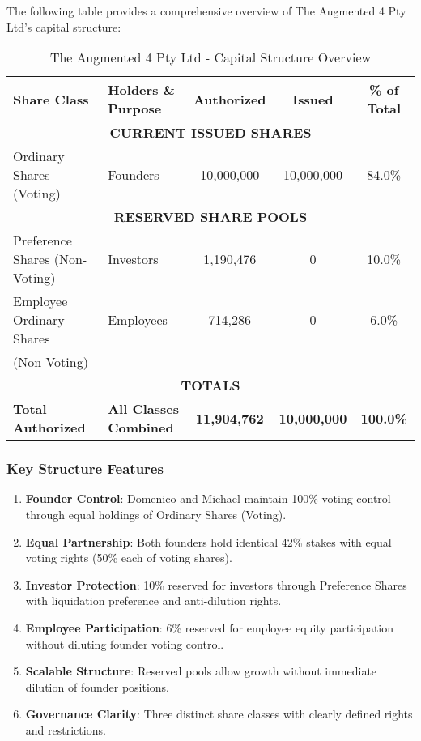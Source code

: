 The following table provides a comprehensive overview of The Augmented 4 Pty Ltd's capital structure:

\begin{table}[H]
\centering
\begin{tabularx}{\textwidth}{|l|X|c|c|c|}
\hline
\textbf{Share Class} & \textbf{Holders \& Purpose} & \textbf{Authorized} & \textbf{Issued} & \textbf{\% of Total} \\
\hline
\multicolumn{5}{|c|}{\textbf{CURRENT ISSUED SHARES}} \\
\hline
Ordinary Shares (Voting) & Founders & 10,000,000 & 10,000,000 & 84.0\% \\
\hline
\multicolumn{5}{|c|}{\textbf{RESERVED SHARE POOLS}} \\
\hline
Preference Shares (Non-Voting) & Investors & 1,190,476 & 0 & 10.0\% \\
\hline
Employee Ordinary Shares & Employees & 714,286 & 0 & 6.0\% \\
(Non-Voting) & & & & \\
\hline
\multicolumn{5}{|c|}{\textbf{TOTALS}} \\
\hline
\textbf{Total Authorized} & \textbf{All Classes Combined} & \textbf{11,904,762} & \textbf{10,000,000} & \textbf{100.0\%} \\
\hline
\end{tabularx}
\caption{The Augmented 4 Pty Ltd - Capital Structure Overview}
\end{table}

\subsubsection{Key Structure Features}

\begin{enumerate}[label=(\alph*)]
\item \textbf{Founder Control}: Domenico and Michael maintain 100\% voting control through equal holdings of Ordinary Shares (Voting).

\item \textbf{Equal Partnership}: Both founders hold identical 42\% stakes with equal voting rights (50\% each of voting shares).

\item \textbf{Investor Protection}: 10\% reserved for investors through Preference Shares with liquidation preference and anti-dilution rights.

\item \textbf{Employee Participation}: 6\% reserved for employee equity participation without diluting founder voting control.

\item \textbf{Scalable Structure}: Reserved pools allow growth without immediate dilution of founder positions.

\item \textbf{Governance Clarity}: Three distinct share classes with clearly defined rights and restrictions.
\end{enumerate} 